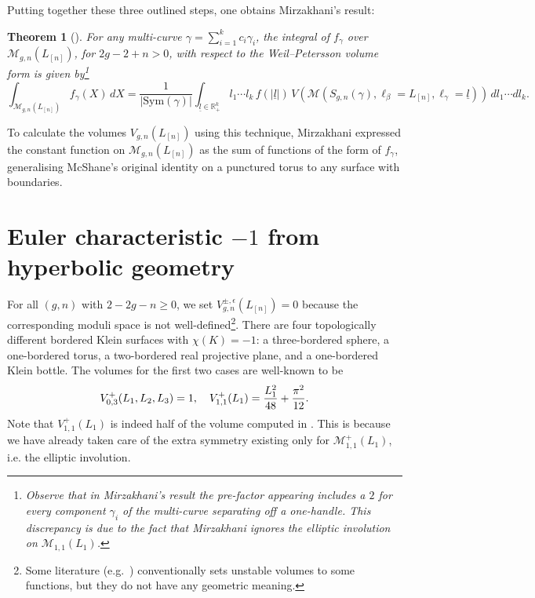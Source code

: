 \documentclass[12pt]{amsart}
\theoremstyle{plain}
\newtheorem{theorem}{Theorem}[section]
\theoremstyle{definition}
\theoremstyle{remark}
\numberwithin{equation}{section}
\begin{document}
Putting together these three outlined steps, one obtains Mirzakhani's result:
\begin{theorem}[{\cite[Theorem 8.1]{Mir06}}]\label{Mirz-unfolding}
For any multi-curve $\gamma=\sum_{i=1}^kc_i\gamma_i$, the integral of $f_{\gamma}$ over $\mathcal{M}_{g,n}(L_{[n]})$, for $2g-2+n>0$, with respect to the Weil--Petersson volume form is given by\footnote{Observe that in Mirzakhani's result the pre-factor appearing includes a $2$ for every component $\gamma_i$ of the multi-curve separating off a one-handle. This discrepancy is due to the fact that Mirzakhani ignores the elliptic involution on $\mathcal{M}_{1,1}(L_{1})$.}
\begin{equation*}
\int_{\mathcal{M}_{g,n}(L_{[n]})} f_{\gamma}(X)\, dX
=\frac{1}{|\mathrm{Sym}(\gamma)|}\int_{\underline{l}\in\mathbb{R}_+^k}l_1\cdots l_k\, f(|\underline{l}|)\, V(\mathcal{M}(S_{g,n}(\gamma),\ell_{\beta}=L_{[n]},\ell_{\gamma}=\underline{l}))\, dl_1\cdots dl_k.
\end{equation*}
\end{theorem}

To calculate the volumes $V_{g,n}(L_{[n]})$ using this technique, Mirzakhani expressed the constant function on $\mathcal{M}_{g,n}(L_{[n]})$ as the sum of functions of the form of $f_{\gamma}$, generalising McShane's original identity on a punctured torus to any surface with boundaries.


\section{Euler characteristic $-1$ from hyperbolic geometry}\label{sec:euler characteristic -1 from geometry}


For all $(g,n)$ with $2-2g-n\geq0$, we set $V^{\pm,\epsilon}_{g,n}(L_{[n]})=0$ because the corresponding moduli space is not well-defined\footnote{Some literature (e.g.~\cite{EO07-2,Sta23}) conventionally sets unstable volumes to some functions, but they do not have any geometric meaning.}. There are four topologically different bordered Klein surfaces with $\chi(K)=-1$: a three-bordered sphere, a one-bordered torus, a two-bordered real projective plane, and a one-bordered Klein bottle. The volumes for the first two cases are well-known to be
\begin{equation}
V_{0,3}^+(L_1,L_2,L_3)=1,\quad V_{1,1}^+(L_1)=\frac{L_1^2}{48}+\frac{\pi^2}{12}.\label{V_{0,3} and V_{1,1}}
\end{equation}
Note that $V_{1,1}^+(L_1)$ is indeed half of the volume computed in \cite{Mir06}. This is because we have already taken care of the extra symmetry existing only for $\mathcal{M}_{1,1}^+(L_1)$, i.e. the elliptic involution.
\end{document}
